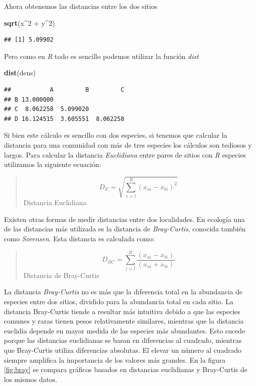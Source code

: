 \documentclass[]{book}
\newenvironment{Shaded}{\begin{snugshade}}{\end{snugshade}}
\newcommand{\KeywordTok}[1]{\textcolor[rgb]{0.13,0.29,0.53}{\textbf{{#1}}}}
\newcommand{\DecValTok}[1]{\textcolor[rgb]{0.00,0.00,0.81}{{#1}}}
\newcommand{\StringTok}[1]{\textcolor[rgb]{0.31,0.60,0.02}{{#1}}}
\newcommand{\NormalTok}[1]{{#1}}
\begin{document}
Ahora obtenemos las distancias entre los dos sitios

\begin{Shaded}
\begin{Highlighting}[]
\KeywordTok{sqrt}\NormalTok{(x^}\DecValTok{2} \NormalTok{+}\StringTok{ }\NormalTok{y^}\DecValTok{2}\NormalTok{)}
\end{Highlighting}
\end{Shaded}

\begin{verbatim}
## [1] 5.09902
\end{verbatim}

Pero como en \emph{R} todo es sencillo podemos utilizar la función
\emph{dist}

\begin{Shaded}
\begin{Highlighting}[]
\KeywordTok{dist}\NormalTok{(dens)}
\end{Highlighting}
\end{Shaded}

\begin{verbatim}
##           A         B         C
## B 13.000000                    
## C  8.062258  5.099020          
## D 16.124515  3.605551  8.062258
\end{verbatim}

Si bien este cálculo es sencillo con dos especies, si tenemos que
calcular la distancia para una comunidad con más de tres especies los
cálculos son tediosos y largos. Para calcular la distancia
\emph{Euclidiana} entre pares de sitios con \emph{R} especies utilizamos
la siguiente ecuación:

\begin{quote}
\[D_E = \sqrt{\sum_{i=l}^R (x_{ai} - x_{bi})^2}\] Distancia Euclidiana
\end{quote}

Existen otras formas de medir distancias entre dos localidades. En
ecología una de las distancias más utilizada es la distancia de
\emph{Bray-Curtis}, conocida también como \emph{Sorensen}. Esta
distancia es calculada como:

\begin{quote}
\[D_{BC} = \sum_{i=l}^R \frac{(x_{ai} - x_{bi})}{(x_{ai} + x_{bi})}\]
Distancia de Bray-Curtis
\end{quote}

La distancia \emph{Bray-Curtis} no es más que la diferencia total en la
abundancia de especies entre dos sitios, dividido para la abundancia
total en cada sitio. La distancia Bray-Curtis tiende a resultar más
intuitiva debido a que las especies comunes y raras tienen pesos
relativamente similares, mientras que la distancia euclidia depende en
mayor medida de las especies más abundantes. Esto sucede porque las
distancias euclidianas se basan en diferencias al cuadrado, mientras que
Bray-Curtis utiliza diferencias absolutas. El elevar un número al
cuadrado siempre amplifica la importancia de los valores más grandes. En
la figura \ref{fig:bray} se compara gráficos basados en distancias
euclidianas y Bray-Curtis de los mismos datos.
\end{document}
